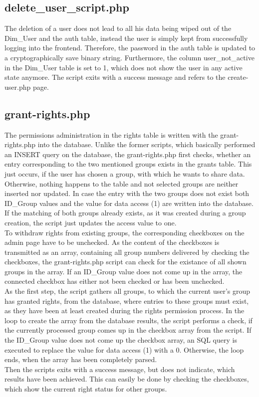 \subsection{delete\_user\_script.php}
The deletion of a user does not lead to all his data being wiped out of the Dim\_User and the auth table, instead the user is simply kept from successfully logging into the frontend. 
Therefore, the password in the auth table is updated to a cryptographically save binary string. Furthermore, the column user\_not\_active in the Dim\_User table is set to 1, which 
does not show the user in any active state anymore. The script exits with a success message and refers to the create-user.php page.

\subsection{grant-rights.php}
The permissions administration in the rights table is written with the grant-rights.php into the database. Unlike the former scripts, which basically performed an INSERT query on 
the database, the grant-rights.php first checks, whether an entry corresponding to the two mentioned groups exists in the grants table. This just occurs, if the user has chosen 
a group, with which he wants to share data. Otherwise, nothing happens to the table and not selected groups are neither inserted nor updated. In case the entry with the two groups 
does not exist both ID\_Group values and the value for data access (1) are written into the database.\\
If the matching of both groups already exists, as it was created during a group creation, the script just updates the access value to one.\\
To withdraw rights from existing groups, the corresponding checkboxes on the admin page have to be unchecked. As the content of the checkboxes is transmitted as an array, containing all group numbers delivered by checking the checkboxes, the grant-rights.php script can check for the existance of all shown groups in the array. If an ID\_Group value does not come up in the array, the connected checkbox has either not been checked or has been unchecked.\\
As the first step, the script gathers all groups, to which the current user's group has granted rights, from the database, where entries to these groups must exist, as they have been at least created during the rights permission process. In the loop to create the array from the database results, the script performs a check, if the currently processed group comes up in the checkbox array from the script. If the ID\_Group value does not come up the checkbox array, an SQL query is executed to replace the value for data access (1) with a 0. Otherwise, the loop ends, when the array has been completely parsed.\\ 
 Then the scripts exits with a success message, but does not indicate, which results have been achieved. This can easily be done by checking the checkboxes, which show the current right status for other groups.
